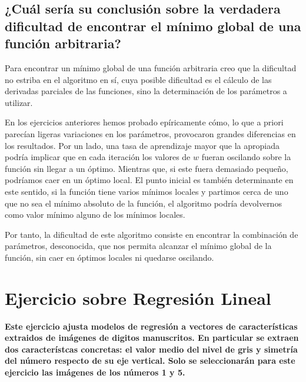 \documentclass[a4paper, 20pt]{article}
\begin{document}
\subsection{¿Cuál sería su conclusión sobre la verdadera dificultad de encontrar el mínimo
global de una función arbitraria?}

Para encontrar un mínimo global de una función arbitraria creo que la dificultad no estriba en el algoritmo en sí, cuya posible dificultad es el cálculo de las derivadas parciales de las funciones, sino la determinación de los parámetros a utilizar.

En los ejercicios anteriores hemos probado epíricamente cómo, lo que a priori parecían ligeras variaciones en los parámetros, provocaron grandes diferencias en los resultados. Por un lado,  una tasa de aprendizaje mayor que la apropiada podría implicar que en cada iteración los valores de $w$ fueran oscilando sobre la función sin llegar a un óptimo. Mientras que, si este fuera demasiado pequeño, podríamos caer en un óptimo local. El punto inicial es también determinante en este sentido, si la función tiene varios mínimos locales y partimos cerca de uno que no sea el mínimo absoluto de la función, el algoritmo podría devolvernos como valor mínimo alguno de los mínimos locales.

Por tanto, la dificultad de este algoritmo consiste en encontrar la combinación de parámetros, desconocida, que nos permita alcanzar el mínimo global de la función, sin caer en óptimos locales ni quedarse oscilando.
\newpage
\section{Ejercicio sobre Regresión Lineal}
\textbf{Este ejercicio ajusta modelos de regresión a vectores de características extraidos de imágenes de digitos manuscritos. En particular se extraen dos característcas concretas: el valor medio del nivel de gris y simetría del número respecto de su eje vertical. Solo se seleccionarán para este ejercicio las imágenes de los números 1 y 5.}


\newpage
\printbibliography
\end{document}
